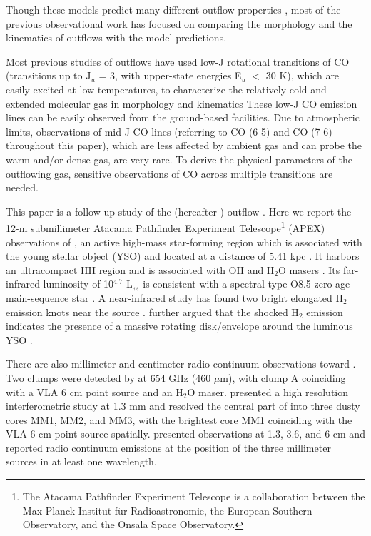 Though these models predict many different outflow properties \citep{2007prpl.conf..245A}, most of the previous observational work has focused on comparing the morphology and the kinematics of outflows with the model predictions. 

Most previous studies of outflows have used low-J rotational transitions of CO (transitions up to J$_u$ = 3, with upper-state energies E$_u$ $<$ 30 K), which are easily excited at low temperatures, to characterize the relatively cold and extended molecular gas in morphology and kinematics  These low-J CO emission lines can be easily observed from the ground-based facilities. Due to atmospheric limits, observations of mid-J CO lines (referring to CO (6-5) and CO (7-6) throughout this paper), which are less affected by ambient gas and can probe the warm and/or dense gas, are very rare. To derive the physical parameters of the outflowing gas, sensitive observations of CO across multiple transitions are needed. 


This paper is a follow-up study of the  (hereafter ) outflow \citep{2009ApJ...696...66Q}. Here we report the 12-m submillimeter Atacama Pathfinder Experiment Telescope\footnote{    The Atacama Pathfinder Experiment Telescope is a collaboration between the Max-Planck-Institut f$\ddot{\mathrm{u}}$r Radioastronomie, the European Southern Observatory, and the Onsala Space Observatory.} (APEX) observations of , an active high-mass star-forming region which is associated with the young stellar object (YSO)  and located at a distance of 5.41 kpc \citep{2015PASJ...67...69S}. It harbors an ultracompact HII region and is associated with OH and H$_2$O masers \citep{1993AJ....105.1495H,1997MNRAS.289..203C,1998AJ....116.1897M,1999ApJS..123..487M,2003MNRAS.341..551C}. Its far-infrared luminosity of 10$^{4.7}$ L$_\sun$ is consistent with a spectral type O8.5 zero-age main-sequence star \citep{1998AJ....116.1897M}. A near-infrared study has found two bright elongated H$_2$ emission knots near the source \citep{2002ApJ...576..313K}. \citet{2003A&A...412..175K} further argued that the shocked H$_2$ emission indicates the presence of a massive rotating disk/envelope around the luminous YSO . 

There are also millimeter and centimeter radio continuum observations toward . Two clumps were detected by \citet{2007ApJ...654L..87C} at 654 GHz (460 $\mu$m), with clump A coinciding with a VLA 6 cm point source \citep{1993AJ....105.1495H} and an H$_2$O maser. \citet{2009ApJ...696...66Q} presented a high resolution interferometric study at 1.3 mm and resolved the central part of  into three dusty cores MM1, MM2, and MM3, with the brightest core MM1 coinciding with the VLA 6 cm point source spatially. \citet{2011AJ....142..147T} presented observations at 1.3, 3.6, and 6 cm and reported radio continuum emissions at the position of the three millimeter sources in at least one wavelength.

